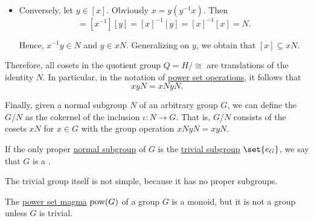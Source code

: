 \begin{definition}
\begin{thmenum}
\begin{itemize}
      \item Conversely, let \( y \in [x] \). Obviously \( x = y (y^{-1} x) \). Then
      \begin{equation*}
        [x^{-1} y] = [x^{-1}] [y] = [x]^{-1} [y] = [x]^{-1} [x] = N.
      \end{equation*}

      Hence, \( x^{-1} y \in N \) and \( y \in xN \). Generalizing on \( y \), we obtain that \( [x] \subseteq xN \).
    \end{itemize}

    Therefore, all cosets in the quotient group \( Q = H / {\cong} \) are translations of the identity \( N \). In particular, in the notation of \hyperref[def:magma/power_set]{power set operations}, it follows that
    \begin{equation*}
      xyN = xN yN.
    \end{equation*}

    Finally, given a normal subgroup \( N \) of an arbitrary group \( G \), we can define the  \( G / N \) as the cokernel of the inclusion \( \iota: N \to G \). That is, \( G / N \) consists of the cosets \( xN \) for \( x \in G \) with the group operation \( xN yN = xyN \).

     If the only proper \hyperref[thm:normal_subgroup_equivalences]{normal subgroup} of \( G \) is the \hyperref[def:group/trivial]{trivial subgroup} \( \set{ e_G } \), we say that \( G \) is a .

    The trivial group itself is not simple, because it has no proper subgroups.
  \end{thmenum}
\end{definition}

\begin{example}\label{ex:power_set_is_not_a_group}
  The \hyperref[def:magma/power_set]{power set magma} \( \operatorname{pow}(G) \) of a group \( G \) is a monoid, but it is not a group unless \( G \) is trivial.
\end{example}

